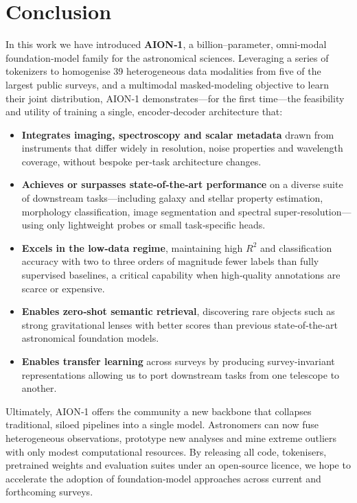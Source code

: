 \documentclass[]{polymathic}
\begin{document}
\section{Conclusion}
In this work we have introduced \textbf{AION‑1}, a billion–parameter, omni-modal foundation‐model family for the astronomical sciences. Leveraging a series of tokenizers to homogenise 39 heterogeneous data modalities from five of the largest public surveys, and a multimodal masked-modeling objective to learn their joint distribution, AION‑1 demonstrates—for the first time—the feasibility and utility of training a single, encoder-decoder architecture that:
\begin{itemize}
    \item \textbf{Integrates imaging, spectroscopy and scalar metadata} drawn from instruments that differ widely in resolution, noise properties and wavelength coverage, without bespoke per‑task architecture changes.
    \item \textbf{Achieves or surpasses state‑of‑the‑art performance} on a diverse suite of downstream tasks—including galaxy and stellar property estimation, morphology classification, image segmentation and spectral super‑resolution—using only lightweight probes or small task‑specific heads.
    \item \textbf{Excels in the low‑data regime}, maintaining high $R^{2}$ and classification accuracy with two to three orders of magnitude fewer labels than fully supervised baselines, a critical capability when high‑quality annotations are scarce or expensive.
    \item \textbf{Enables zero‑shot semantic retrieval}, discovering rare objects such as strong gravitational lenses with better scores than previous state-of-the-art astronomical foundation models.
    \item \textbf{Enables transfer learning} across surveys by producing survey-invariant representations allowing us to port downstream tasks from one telescope to another.
\end{itemize}
Ultimately, AION‑1 offers the community a new backbone that collapses traditional, siloed pipelines into a single model. Astronomers can now fuse heterogeneous observations, prototype new analyses and mine extreme outliers with only modest computational resources. By releasing all code, tokenisers, pretrained weights and evaluation suites under an open‑source licence, we hope to accelerate the adoption of foundation‑model approaches across current and forthcoming surveys.
\end{document}
